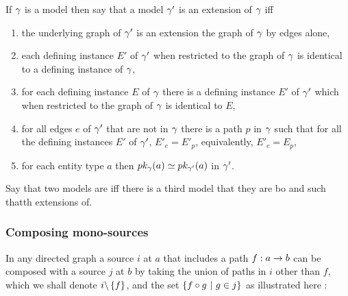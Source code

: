\begin{definition}
If $\genericmodel$ is a model then say that a model $\genericmodel'$ is an extension of 
$\genericmodel$ iff 
\begin{enumerate}
\item the underlying graph of $\genericmodel'$ is an extension the graph of $\genericmodel$
by edges alone, 
\item each defining instance $E'$ of $\genericmodel'$ when restricted to the graph of $\genericmodel$
is identical to a defining instance of $\genericmodel$,
\item for each defining instance $E$ of $\genericmodel$ there is a defining instance $E'$ of $\genericmodel'$ which when restricted to the graph of $\genericmodel$
is identical to $E$,
\item for all edges $e$ of $\genericmodel'$ that are not in $\genericmodel$ there is a path 
$p$ in $\genericmodel$ such that for all the defining instances $E'$ of $\genericmodel'$,
$E'_e=E'_p$, equivalently, $E'_e=E_p$,
\item for each entity type $a$  then $\pk[\genericmodel]{a} \simeq \pk[\genericmodel']{a}$ in $\genericmodel'$. 
\end{enumerate}
\end{definition}

\begin{definition}
Say that two models are   iff there is a third model that they are bo and such thatth extensions of.
\end{definition}

\subsubsection{Composing mono-sources}


In any directed graph a source $i$ at $a$ that includes a path $f:a \morph b$ can be composed with a source $j$ at $b$ by taking the union of paths in $i$ other than $f$, which we shall denote $i\backslash \set{f}$, and the set $\setsuchthat{f \circ g}{g \in j}$ as illustrated here :

